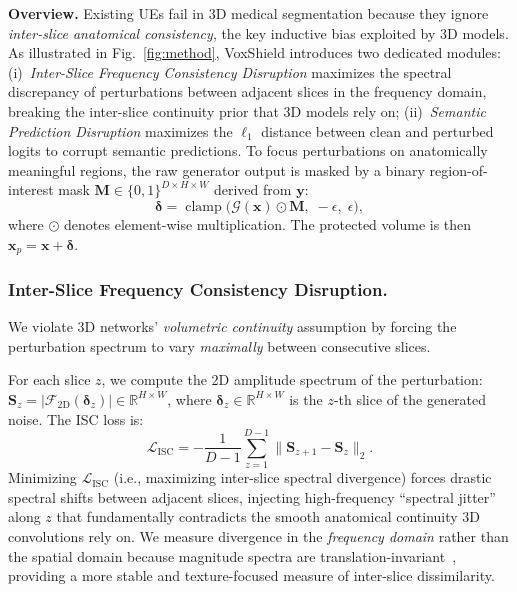 \documentclass[runningheads]{llncs}
\begin{document}
\textbf{Overview.}\quad
Existing UEs fail in 3D medical segmentation because they ignore
\textit{inter-slice anatomical consistency}, the key inductive bias
exploited by 3D models. As illustrated in Fig.~\ref{fig:method},
VoxShield introduces two dedicated modules: (i)~\textit{Inter-Slice Frequency Consistency Disruption} maximizes the spectral
discrepancy of perturbations between adjacent slices in the frequency
domain, breaking the inter-slice continuity prior that 3D models rely on;
(ii)~\textit{Semantic Prediction Disruption} maximizes the $\ell_1$
distance between clean and perturbed logits to corrupt semantic
predictions.
To focus perturbations on anatomically meaningful regions, the raw
generator output is masked by a binary region-of-interest mask
$\bm{M}\!\in\!\{0,1\}^{D\times H\times W}$ derived from $\bm{y}$:
\begin{equation}
  \bm{\delta} = \operatorname{clamp}\!\bigl(
\mathcal{G}(\bm{x})\odot\bm{M},\;-\epsilon,\;\epsilon\bigr),
  \label{eq:mask}
\end{equation}
where $\odot$ denotes element-wise multiplication.
The protected volume is then $\bm{x}_p\!=\!\bm{x}+\bm{\delta}$.

\subsubsection{Inter-Slice Frequency Consistency Disruption.}
We violate 3D networks' \textit{volumetric continuity} assumption by
forcing the perturbation spectrum to vary \textit{maximally} between
consecutive slices.

For each slice $z$, we compute the 2D amplitude
spectrum of the perturbation:
$\bm{S}_z=|\mathcal{F}_{2\text{D}}(\bm{\delta}_z)|\in\mathbb{R}^{H\times W}$,
where $\bm{\delta}_z\!\in\!\mathbb{R}^{H\times W}$ is the
$z$-th slice of the generated noise. The ISC loss is:
\begin{equation}
  \mathcal{L}_{\text{ISC}}
  =-\frac{1}{D{-}1}\sum_{z=1}^{D-1}
    \bigl\|\bm{S}_{z+1}-\bm{S}_z\bigr\|_2.
  \label{eq:isc}
\end{equation}
Minimizing $\mathcal{L}_{\text{ISC}}$ (i.e., maximizing inter-slice spectral
divergence) forces drastic spectral shifts between adjacent slices,
injecting high-frequency ``spectral jitter'' along $z$ that
fundamentally contradicts the smooth anatomical continuity 3D
convolutions rely on.
We measure divergence in the \textit{frequency domain} rather than
the spatial domain because magnitude spectra are
translation-invariant~\cite{yin2019fourier,wang2020high}, providing a more stable
and texture-focused measure of inter-slice dissimilarity.
\end{document}
